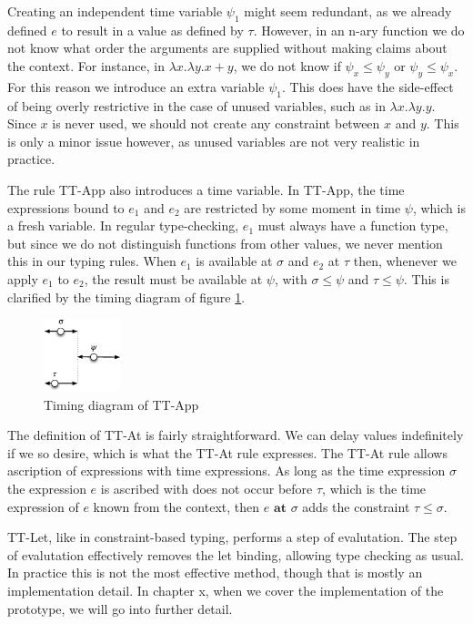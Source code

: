 Creating an independent time variable $\psi_1$ might seem redundant, as we already defined $e$ to result in a value as defined by $\tau$.
However, in an n-ary function we do not know what order the arguments are supplied without making claims about the context.
For instance, in $\lambda x. \lambda y. x + y$, we do not know if $\psi_x \le \psi_y$ or $\psi_y \le \psi_x$.
For this reason we introduce an extra variable $\psi_1$.
This does have the side-effect of being overly restrictive in the case of unused variables, such as in $\lambda x. \lambda y. y$.
Since $x$ is never used, we should not create any constraint between $x$ and $y$. 
This is only a minor issue however, as unused variables are not very realistic in practice.

The rule TT-App also introduces a time variable. 
In TT-App, the time expressions bound to $e_1$ and $e_2$ are restricted by some moment in time $\psi$, which is a fresh variable.
In regular type-checking, $e_1$ must always have a function type, but since we do not distinguish functions from other values, we never mention this in our typing rules.
When $e_1$ is available at $\sigma$ and $e_2$ at $\tau$ then, whenever we apply $e_1$ to $e_2$, the result must be available at $\psi$, with $\sigma \le \psi$ and $\tau \le \psi$.
This is clarified by the timing diagram of figure \ref{fig:ttapp}.

\begin{figure}[h]
\centering
\includegraphics[width=0.2\textwidth]{images/ttapp}
\caption{Timing diagram of TT-App}
\label{fig:ttapp}
\end{figure}

The definition of TT-At is fairly straightforward.
We can delay values indefinitely if we so desire, which is what the TT-At rule expresses.
The TT-At rule allows ascription of expressions with time expressions.
As long as the time expression $\sigma$ the expression $e$ is ascribed with does not occur before $\tau$, which is the time expression of $e$ known from the context, then $e \textbf{ at } \sigma$ adds the constraint $\tau \le \sigma$.

TT-Let, like in constraint-based typing, performs a step of evalutation.
The step of evalutation effectively removes the let binding, allowing type checking as usual.
In practice this is not the most effective method, though that is mostly an implementation detail.
In chapter x, when we cover the implementation of the prototype, we will go into further detail.


